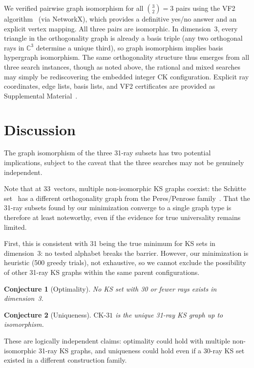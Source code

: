 \documentclass[twocolumn,prl,superscriptaddress,nofootinbib]{revtex4-2}
\newcommand{\C}{\mathbb{C}}
\newcommand{\CK}{\mathrm{CK}\text{-}31}
\newtheorem{conjecture}{Conjecture}
\begin{document}
We verified pairwise graph isomorphism for all $\binom{3}{2} = 3$ pairs using the VF2 algorithm~\cite{CordellaEtAl2004} (via NetworkX), which provides a definitive yes/no answer and an explicit vertex mapping. All three pairs are isomorphic. In dimension~3, every triangle in the orthogonality graph is already a basis triple (any two orthogonal rays in $\C^3$ determine a unique third), so graph isomorphism implies basis hypergraph isomorphism. The same orthogonality structure thus emerges from all three search instances, though as noted above, the rational and mixed searches may simply be rediscovering the embedded integer CK configuration. Explicit ray coordinates, edge lists, basis lists, and VF2 certificates are provided as Supplemental Material~\cite{SupplementalMaterial}.

\section{Discussion}

The graph isomorphism of the three 31-ray subsets has two potential implications, subject to the caveat that the three searches may not be genuinely independent.

Note that at 33~vectors, multiple non-isomorphic KS graphs coexist: the Sch\"utte set~\cite{Schutte1965,GouldAravind2010} has a different orthogonality graph from the Peres/Penrose family~\cite{GouldAravind2010,Cabello2025simplest}. That the 31-ray subsets found by our minimization converge to a single graph type is therefore at least noteworthy, even if the evidence for true universality remains limited.

First, this is consistent with 31 being the true minimum for KS sets in dimension~3: no tested alphabet breaks the barrier. However, our minimization is heuristic (500 greedy trials), not exhaustive, so we cannot exclude the possibility of other 31-ray KS graphs within the same parent configurations.

\begin{conjecture}[Optimality]
No KS set with 30 or fewer rays exists in dimension~3.
\end{conjecture}

\begin{conjecture}[Uniqueness]
$\CK$ is the unique 31-ray KS graph up to isomorphism.
\end{conjecture}

\noindent These are logically independent claims: optimality could hold with multiple non-isomorphic 31-ray KS graphs, and uniqueness could hold even if a 30-ray KS set existed in a different construction family.
\end{document}
